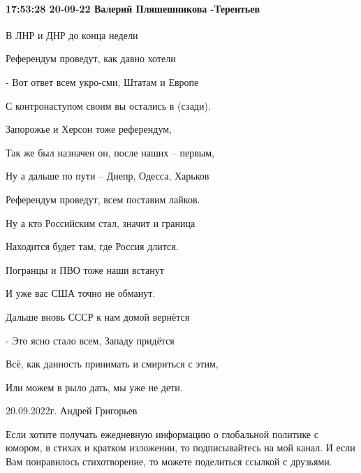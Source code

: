  
 
 
 
 

\paragraph{17:53:28 20-09-22 Валерий Пляшешникова -Терентьев}

В ЛНР и ДНР до конца недели

Референдум проведут, как давно хотели

- Вот ответ всем укро-сми, Штатам и Европе

С контронаступом своим вы остались в (сзади).

Запорожье и Херсон тоже референдум,

Так же был назначен он, после наших – первым,

Ну а дальше по пути – Днепр, Одесса, Харьков

Референдум проведут, всем поставим лайков.

Ну а кто Российским стал, значит и граница

Находится будет там, где Россия длится.

Погранцы и ПВО тоже наши встанут

И уже вас США точно не обманут.

Дальше вновь СССР к нам домой вернётся

- Это ясно стало всем, Западу придётся

Всё, как данность принимать и смириться с этим,

Или можем в рыло дать, мы уже не дети.

20.09.2022г. Андрей Григорьев

Если хотите получать ежедневную информацию о глобальной политике с юмором, в стихах и кратком изложении, то подписывайтесь на мой канал. И если Вам понравилось стихотворение, то можете поделиться ссылкой с друзьями.


